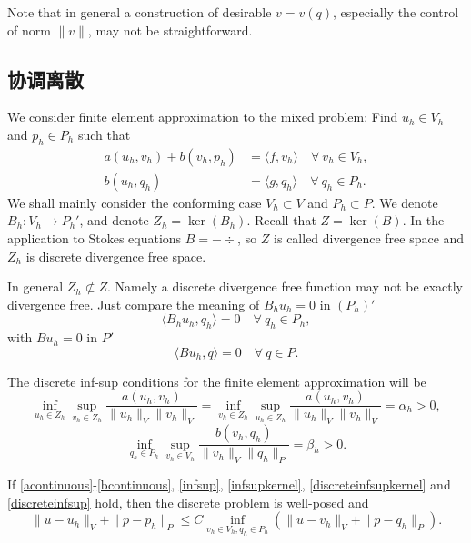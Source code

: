 Note that in general a construction of desirable $v = v(q)$, especially the control of norm
$\|v\|$, may not be straightforward.

\subsection{协调离散}
We consider finite element approximation to the mixed
problem: Find $u_h\in V_h$ and $p_h\in P_h$ such that
\begin{align}
a(u_h, v_h)+ b(v_h, p_h) & =\langle f, v_h\rangle \quad \forall~v_h\in V_h, \label{abstractmfem1}\\
b(u_h, q_h) & =\langle g, q_h\rangle  \quad \forall~q_h\in P_h.\label{abstractmfem2}
\end{align}
We shall mainly consider the conforming case $V_h\subset V$ and $P_h\subset P$. We denote $B_h:
V_h\to P_h'$, and denote $Z_h = \ker(B_h)$. Recall that $Z = \ker(B)$. In the application
to Stokes equations $B = -\div$, so $Z$ is called divergence free space and $Z_h$ is discrete
divergence free space.

\begin{remark}
In general $Z_h \not\subset Z$. Namely a discrete divergence free function may not be
exactly divergence free. Just compare the meaning of $B_hu_h = 0$ in $(P_h)'$
\[
\langle B_hu_h, q_h\rangle=0\quad\forall~q_h\in P_h,
\]
with $Bu_h=0$ in $P'$
\[
\langle Bu_h, q\rangle=0\quad\forall~q\in P.
\]
\end{remark}

The discrete inf-sup conditions for the finite element approximation will be
\begin{equation}\label{discreteinfsupkernel}
\inf_{u_h\in Z_h}\sup_{v_h\in Z_h}\frac{a(u_h, v_h)}{\|u_h\|_V\|v_h\|_V}=\inf_{v_h\in Z_h}\sup_{u_h\in Z_h}\frac{a(u_h, v_h)}{\|u_h\|_V\|v_h\|_V}=\alpha_h>0,
\end{equation}
\begin{equation}\label{discreteinfsup}
\inf_{q_h\in P_h}\sup_{v_h\in V_h}\frac{b(v_h, q_h)}{\|v_h\|_V\|q_h\|_P}=\beta_h>0.
\end{equation}

\begin{theorem}
If \eqref{acontinuous}-\eqref{bcontinuous}, \eqref{infsup}, \eqref{infsupkernel}, \eqref{discreteinfsupkernel} and \eqref{discreteinfsup} hold, then the discrete problem is well-posed and
\[
\|u-u_h\|_V+\|p-p_h\|_P\leq C\inf_{v_h\in V_h, q_h\in P_h}(\|u-v_h\|_V+\|p-q_h\|_P).
\]
\end{theorem}

